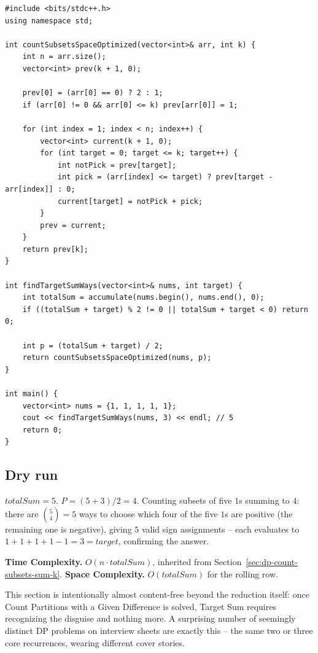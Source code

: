 \begin{lstlisting}
#include <bits/stdc++.h>
using namespace std;

int countSubsetsSpaceOptimized(vector<int>& arr, int k) {
    int n = arr.size();
    vector<int> prev(k + 1, 0);

    prev[0] = (arr[0] == 0) ? 2 : 1;
    if (arr[0] != 0 && arr[0] <= k) prev[arr[0]] = 1;

    for (int index = 1; index < n; index++) {
        vector<int> current(k + 1, 0);
        for (int target = 0; target <= k; target++) {
            int notPick = prev[target];
            int pick = (arr[index] <= target) ? prev[target - arr[index]] : 0;
            current[target] = notPick + pick;
        }
        prev = current;
    }
    return prev[k];
}

int findTargetSumWays(vector<int>& nums, int target) {
    int totalSum = accumulate(nums.begin(), nums.end(), 0);
    if ((totalSum + target) % 2 != 0 || totalSum + target < 0) return 0;

    int p = (totalSum + target) / 2;
    return countSubsetsSpaceOptimized(nums, p);
}

int main() {
    vector<int> nums = {1, 1, 1, 1, 1};
    cout << findTargetSumWays(nums, 3) << endl; // 5
    return 0;
}
\end{lstlisting}

\subsection*{Dry run}


$\textit{totalSum}=5$. $P = (5+3)/2 = 4$. Counting subsets of five
$1$s summing to $4$: there are $\binom{5}{4}=5$ ways to choose which
four of the five $1$s are positive (the remaining one is negative),
giving $5$ valid sign assignments -- each evaluates to
$1+1+1+1-1=3=\textit{target}$, confirming the answer.

\begin{complexitybox}
\textbf{Time Complexity.} $O(n \cdot \textit{totalSum})$, inherited
from Section~\ref{sec:dp-count-subsets-sum-k}.
\textbf{Space Complexity.} $O(\textit{totalSum})$ for the rolling row.
\end{complexitybox}

\begin{takeawaybox}
This section is intentionally almost content-free beyond the reduction
itself: once Count Partitions with a Given Difference is solved, Target
Sum requires recognizing the disguise and nothing more. A surprising
number of seemingly distinct DP problems on interview sheets are exactly
this -- the same two or three core recurrences, wearing different cover
stories.
\end{takeawaybox}
